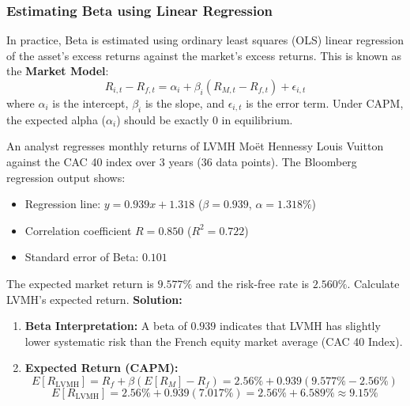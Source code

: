 \subsubsection{Estimating Beta using Linear Regression}
In practice, Beta is estimated using ordinary least squares (OLS) linear regression of the asset's excess returns against the market's excess returns. This is known as the \textbf{Market Model}:
\begin{equation}
	R_{i,t} - R_{f,t} = \alpha_i + \beta_i \left( R_{M,t} - R_{f,t} \right) + \epsilon_{i,t}
	\label{eq:market_model_m8}
\end{equation}
where $\alpha_i$ is the intercept, $\beta_i$ is the slope, and $\epsilon_{i,t}$ is the error term. Under CAPM, the expected alpha ($\alpha_i$) should be exactly 0 in equilibrium.
\begin{tcolorbox}[
	colback=gray!5!white,
	colframe=black!15!white,
	boxrule=0.5pt,
	arc=3pt,
	title=\textbf{Example 15: Estimating LVMH's Beta via Bloomberg},
	coltitle=black,
	colbacktitle=black!5!white,
	before skip=6pt,
	after skip=6pt,
	breakable
]
An analyst regresses monthly returns of LVMH Moët Hennessy Louis Vuitton against the CAC 40 index over 3 years ($36$ data points). The Bloomberg regression output shows:
\begin{itemize}
	\item Regression line: $y = 0.939 x + 1.318$ ($\beta = 0.939$, $\alpha = 1.318\%$)
	\item Correlation coefficient $R = 0.850$ ($R^2 = 0.722$)
	\item Standard error of Beta: $0.101$
\end{itemize}
The expected market return is $9.577\%$ and the risk-free rate is $2.560\%$. Calculate LVMH's expected return.
\textbf{Solution:}
\begin{enumerate}
	\item \textbf{Beta Interpretation:} A beta of $0.939$ indicates that LVMH has slightly lower systematic risk than the French equity market average (CAC 40 Index).
	\item \textbf{Expected Return (CAPM):}
	      \[
	      E[R_{\text{LVMH}}] = R_f + \beta (E[R_M] - R_f) = 2.56\% + 0.939(9.577\% - 2.56\%)
	      \]
	      \[
	      E[R_{\text{LVMH}}] = 2.56\% + 0.939(7.017\%) = 2.56\% + 6.589\% \approx 9.15\%
	      \]
\end{enumerate}
\end{tcolorbox}
